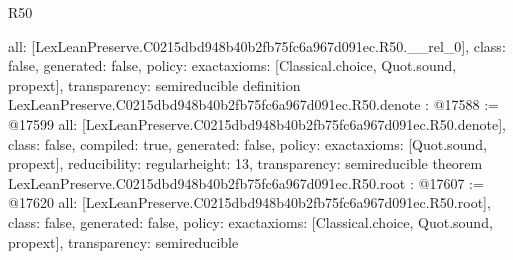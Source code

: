 \begin{lexlean}{R50}
\begin{coremodule}
{  all: [LexLeanPreserve.C0215dbd948b40b2fb75fc6a967d091ec.R50.__rel_0],
  class: false,
  generated: false,
  policy: exact{axioms: [Classical.choice, Quot.sound, propext]},
  transparency: semireducible
}
definition LexLeanPreserve.C0215dbd948b40b2fb75fc6a967d091ec.R50.denote : @17588 := @17599 {
  all: [LexLeanPreserve.C0215dbd948b40b2fb75fc6a967d091ec.R50.denote],
  class: false,
  compiled: true,
  generated: false,
  policy: exact{axioms: [Quot.sound, propext]},
  reducibility: regular{height: 13},
  transparency: semireducible
}
theorem LexLeanPreserve.C0215dbd948b40b2fb75fc6a967d091ec.R50.root : @17607 := @17620 {
  all: [LexLeanPreserve.C0215dbd948b40b2fb75fc6a967d091ec.R50.root],
  class: false,
  generated: false,
  policy: exact{axioms: [Classical.choice, Quot.sound, propext]},
  transparency: semireducible
}


\end{coremodule}
\end{lexlean}
